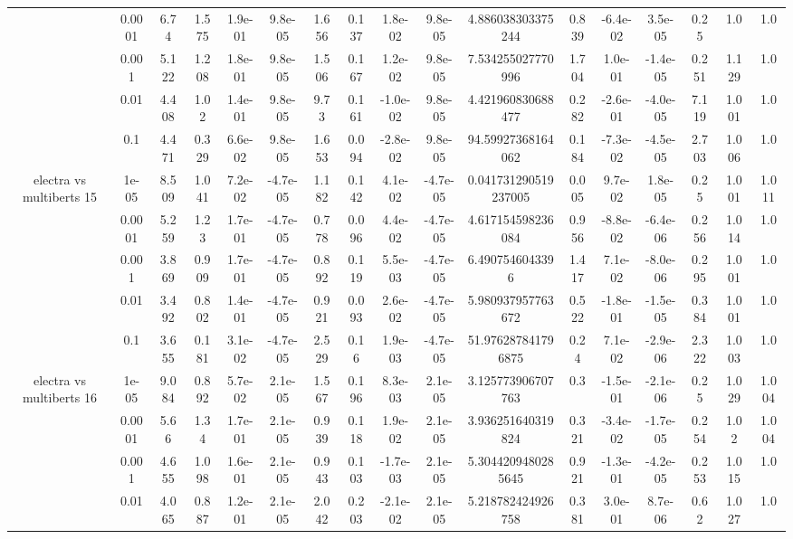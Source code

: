 \begin{tabular}{|c|c|c|c|c|c|c|c|c|c|c|c|c|c|c|c|c|}
 & 0.0001 & 6.74 & 1.575 & 1.9e-01 & 9.8e-05 & 1.656 & 0.137 & 1.8e-02 & 9.8e-05 & 4.886038303375244 & 0.839 & -6.4e-02 & 3.5e-05 & 0.25 & 1.0 & 1.0 \\
 & 0.001 & 5.122 & 1.208 & 1.8e-01 & 9.8e-05 & 1.506 & 0.167 & 1.2e-02 & 9.8e-05 & 7.534255027770996 & 1.704 & 1.0e-01 & -1.4e-05 & 0.251 & 1.129 & 1.0 \\
 & 0.01 & 4.408 & 1.02 & 1.4e-01 & 9.8e-05 & 9.73 & 0.161 & -1.0e-02 & 9.8e-05 & 4.421960830688477 & 0.282 & -2.6e-01 & -4.0e-05 & 7.119 & 1.001 & 1.0 \\
 & 0.1 & 4.471 & 0.329 & 6.6e-02 & 9.8e-05 & 1.653 & 0.094 & -2.8e-02 & 9.8e-05 & 94.59927368164062 & 0.184 & -7.3e-02 & -4.5e-05 & 2.703 & 1.006 & 1.0 \\
\hline
\multirow{5}{*}{electra  vs multiberts 15} & 1e-05 & 8.509 & 1.041 & 7.2e-02 & -4.7e-05 & 1.182 & 0.142 & 4.1e-02 & -4.7e-05 & 0.041731290519237005 & 0.005 & 9.7e-02 & 1.8e-05 & 0.25 & 1.001 & 1.011 \\
 & 0.0001 & 5.259 & 1.23 & 1.7e-01 & -4.7e-05 & 0.778 & 0.096 & 4.4e-02 & -4.7e-05 & 4.617154598236084 & 0.956 & -8.8e-02 & -6.4e-06 & 0.256 & 1.014 & 1.0 \\
 & 0.001 & 3.869 & 0.909 & 1.7e-01 & -4.7e-05 & 0.892 & 0.119 & 5.5e-03 & -4.7e-05 & 6.4907546043396 & 1.417 & 7.1e-02 & -8.0e-06 & 0.295 & 1.001 & 1.0 \\
 & 0.01 & 3.492 & 0.802 & 1.4e-01 & -4.7e-05 & 0.921 & 0.093 & 2.6e-02 & -4.7e-05 & 5.980937957763672 & 0.522 & -1.8e-01 & -1.5e-05 & 0.384 & 1.001 & 1.0 \\
 & 0.1 & 3.655 & 0.181 & 3.1e-02 & -4.7e-05 & 2.529 & 0.16 & 1.9e-03 & -4.7e-05 & 51.976287841796875 & 0.24 & 7.1e-02 & -2.9e-06 & 2.322 & 1.003 & 1.0 \\
\hline
\multirow{5}{*}{electra  vs multiberts 16} & 1e-05 & 9.084 & 0.892 & 5.7e-02 & 2.1e-05 & 1.567 & 0.196 & 8.3e-03 & 2.1e-05 & 3.125773906707763 & 0.3 & -1.5e-01 & -2.1e-06 & 0.25 & 1.029 & 1.004 \\
 & 0.0001 & 5.66 & 1.34 & 1.7e-01 & 2.1e-05 & 0.939 & 0.118 & 1.9e-02 & 2.1e-05 & 3.936251640319824 & 0.321 & -3.4e-02 & -1.7e-05 & 0.254 & 1.02 & 1.004 \\
 & 0.001 & 4.655 & 1.098 & 1.6e-01 & 2.1e-05 & 0.943 & 0.103 & -1.7e-03 & 2.1e-05 & 5.3044209480285645 & 0.921 & -1.3e-01 & -4.2e-05 & 0.253 & 1.015 & 1.0 \\
 & 0.01 & 4.065 & 0.887 & 1.2e-01 & 2.1e-05 & 2.042 & 0.203 & -2.1e-02 & 2.1e-05 & 5.218782424926758 & 0.381 & 3.0e-01 & 8.7e-06 & 0.62 & 1.027 & 1.0 \\

\end{tabular}
